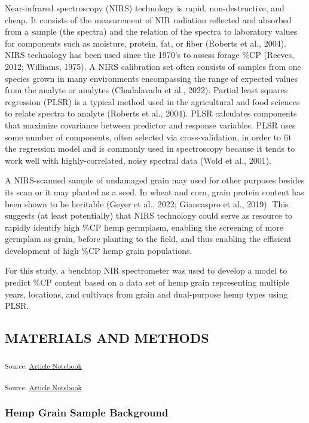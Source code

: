 \documentclass[
]{agujournal2019}
\begin{document}
Near-infrared spectroscopy (NIRS) technology is rapid, non-destructive,
and cheap. It consists of the measurement of NIR radiation reflected and
absorbed from a sample (the spectra) and the relation of the spectra to
laboratory values for components such as moisture, protein, fat, or
fiber (Roberts et al., 2004). NIRS technology has been used since the
1970's to assess forage \%CP (Reeves, 2012; Williams, 1975). A NIRS
calibration set often consists of samples from one species grown in many
environments encompassing the range of expected values from the analyte
or analytes (Chadalavada et al., 2022). Partial least squares regression
(PLSR) is a typical method used in the agricultural and food sciences to
relate spectra to analyte (Roberts et al., 2004). PLSR calculates
components that maximize covariance between predictor and response
variables. PLSR uses some number of components, often selected via
cross-validation, in order to fit the regression model and is commonly
used in spectroscopy because it tends to work well with
highly-correlated, noisy spectral data (Wold et al., 2001).

A NIRS-scanned sample of undamaged grain may used for other purposes
besides its scan or it may planted as a seed. In wheat and corn, grain
protein content has been shown to be heritable (Geyer et al., 2022;
Giancaspro et al., 2019). This suggests (at least potentially) that NIRS
technology could serve as resource to rapidly identify high \%CP hemp
germplasm, enabling the screening of more germplam as grain, before
planting to the field, and thus enabling the efficient development of
high \%CP hemp grain populations.

For this study, a benchtop NIR spectrometer was used to develop a model
to predict \%CP content based on a data set of hemp grain representing
multiple years, locations, and cultivars from grain and dual-purpose
hemp types using PLSR.

\subsection{MATERIALS AND METHODS}\label{materials-and-methods}

\textsubscript{Source:
\href{https://rvcrawford.github.io/glowing-system/index.qmd.html}{Article
Notebook}}

\textsubscript{Source:
\href{https://rvcrawford.github.io/glowing-system/index.qmd.html}{Article
Notebook}}

\subsubsection{Hemp Grain Sample
Background}\label{hemp-grain-sample-background}
\end{document}
